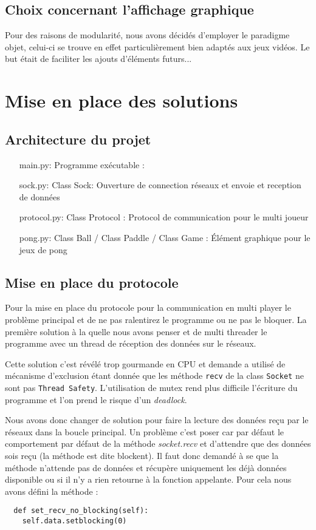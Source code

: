 \documentclass[12pt]{report}
\begin{document}
\chapter{Choix concernant l'affichage graphique} %
Pour des raisons de modularité, nous avons décidés d'employer le
paradigme objet, celui-ci se trouve en effet particulièrement bien
adaptés aux jeux vidéos. Le but était de faciliter les ajouts
d'éléments futurs...

\part{Mise en place des solutions}
\chapter{Architecture du projet}
\begin{itemize}
\item[main.py: ] Programme exécutable : 
\item[sock.py: ] Class Sock: Ouverture de connection réseaux et envoie
  et reception de données 
\item[protocol.py: ] Class Protocol : Protocol de communication pour le
  multi joueur
\item[pong.py: ] Class Ball / Class Paddle / Class Game : Élément graphique
  pour le jeux de pong 
\end{itemize}

\chapter{Mise en place du protocole}
Pour la mise en place du protocole pour la communication en multi player le
problème principal et de ne pas ralentirez le programme ou ne pas le bloquer.
La première solution à la quelle nous avons penser et de multi threader le
programme avec un thread de réception des données sur le réseaux.

Cette solution c'est révélé trop gourmande en CPU et demande a utilisé de
mécanisme d'exclusion étant donnée que les méthode \texttt{recv} de la class
\texttt{Socket} ne sont pas \texttt{Thread Safety}.
L'utilisation de mutex rend plus difficile l'écriture du programme et l'on
prend le risque d'un \textit{deadlock}.

Nous avons donc changer de solution pour faire la lecture des données reçu
par le réseaux dans la boucle principal.
Un problème c'est poser car par défaut le comportement par défaut de la
méthode \textit{socket.recv} et d'attendre que des données sois reçu (la
méthode est dite blockent). Il faut donc demandé à se que la méthode
n'attende pas de données et récupère uniquement les déjà données
disponible ou si il n'y a rien retourne à la fonction appelante.
Pour cela nous avons défini la méthode :
\begin{verbatim}
  def set_recv_no_blocking(self):
    self.data.setblocking(0)
\end{verbatim}
\end{document}
